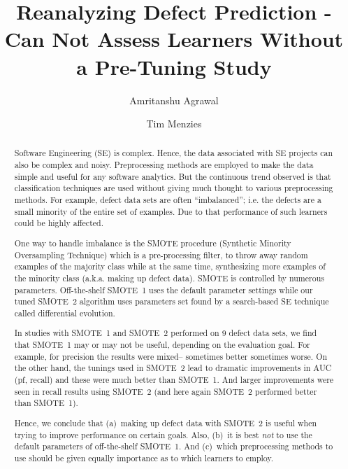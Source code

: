 \documentclass[sigconf,review, anonymous]{acmart}
\theoremstyle{break}
\begin{document}

\title{Reanalyzing Defect Prediction - Can Not Assess Learners Without a Pre-Tuning Study}

\author{Amritanshu Agrawal}

\author{Tim Menzies}



\begin{abstract}
Software Engineering (SE) is complex. Hence, the data associated with SE projects 
can also be complex and noisy. Preprocessing methods are employed to make the data 
simple and useful for any software analytics. But the continuous trend observed 
is that classification techniques are used without giving much thought to various 
preprocessing methods. For example, defect data sets are often ``imbalanced''; 
i.e. the defects are a small minority of the entire set of examples. Due to that 
performance of such learners could be highly affected.

One way to handle imbalance is the SMOTE procedure (Synthetic Minority Oversampling Technique) which is a pre-processing filter, to
throw away random examples of the majority
class while at the same time, synthesizing
more examples 
of the minority class (a.k.a. making up defect data). 
SMOTE is controlled by numerous
parameters. Off-the-shelf SMOTE~1  uses the default
parameter settings while our tuned SMOTE~2 algorithm
uses parameters set found by a search-based SE technique
called differential evolution. 

In studies with SMOTE~1 and SMOTE~2 performed on
 9 defect data sets, we find that SMOTE~1 may or may not be useful, depending on the evaluation goal. For example,
 for precision the results were mixed-- sometimes better sometimes worse.
On the other hand, the tunings
used in SMOTE~2 lead to dramatic improvements in  AUC (pf, recall) and these were 
much better than SMOTE~1. And larger improvements were seen in recall results using SMOTE~2 (and here again SMOTE~2 performed better than SMOTE~1).

Hence, we conclude that (a)~making up defect data with SMOTE~2 is useful when trying to improve performance on certain goals. Also, (b)~it is best {\em not} to use the default parameters of off-the-shelf SMOTE~1. And (c)~which preprocessing methods to use should be
given equally importance as to which learners to employ.
\end{abstract}
\end{document}

